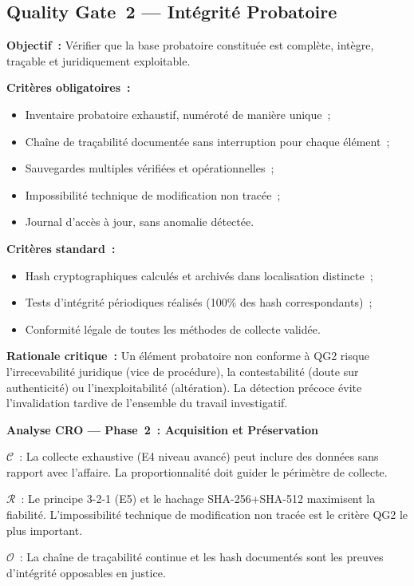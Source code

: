 \subsection{Quality Gate~2 --- Intégrité Probatoire}

\textbf{Objectif~:} Vérifier que la base probatoire constituée est complète,
intègre, traçable et juridiquement exploitable.

\textbf{Critères obligatoires~:}
\begin{itemize}
    \item Inventaire probatoire exhaustif, numéroté de manière unique~;
    \item Chaîne de traçabilité documentée sans interruption pour chaque élément~;
    \item Sauvegardes multiples vérifiées et opérationnelles~;
    \item Impossibilité technique de modification non tracée~;
    \item Journal d'accès à jour, sans anomalie détectée.
\end{itemize}

\textbf{Critères standard~:}
\begin{itemize}
    \item Hash cryptographiques calculés et archivés dans localisation distincte~;
    \item Tests d'intégrité périodiques réalisés (100\% des hash correspondants)~;
    \item Conformité légale de toutes les méthodes de collecte validée.
\end{itemize}

\textbf{Rationale critique~:} Un élément probatoire non conforme à QG2 risque
l'irrecevabilité juridique (vice de procédure), la contestabilité (doute sur
authenticité) ou l'inexploitabilité (altération). La détection précoce évite
l'invalidation tardive de l'ensemble du travail investigatif.

\begin{boxCRO}
\textbf{Analyse CRO --- Phase~2~: Acquisition et Préservation}

$\mathcal{C}$~: La collecte exhaustive (E4 niveau avancé) peut inclure des
données sans rapport avec l'affaire. La proportionnalité doit guider le
périmètre de collecte.

$\mathcal{R}$~: Le principe 3-2-1 (E5) et le hachage SHA-256+SHA-512 maximisent
la fiabilité. L'impossibilité technique de modification non tracée est le
critère QG2 le plus important.

$\mathcal{O}$~: La chaîne de traçabilité continue et les hash documentés sont
les preuves d'intégrité opposables en justice.

\end{boxCRO}

